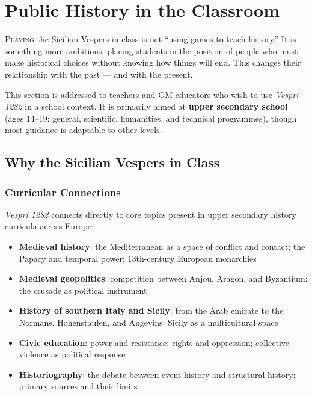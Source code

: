 
\chapter{Public History in the Classroom}

\lettrine[lines=3]{P}{laying} the Sicilian Vespers in class is not
``using games to teach history.'' It is something more ambitious:
placing students in the position of people who must make historical
choices without knowing how things will end. This changes their
relationship with the past --- and with the present.

This section is addressed to teachers and GM-educators who wish to
use \textit{Vespri 1282} in a school context. It is primarily aimed
at \textbf{upper secondary school} (ages 14--19: general, scientific,
humanities, and technical programmes), though most guidance is adaptable
to other levels.


\secsep

\section{Why the Sicilian Vespers in Class}

\subsection{Curricular Connections}

\textit{Vespri 1282} connects directly to core topics present in upper
secondary history curricula across Europe:

\begin{itemize}
  \item \textbf{Medieval history}: the Mediterranean as a space of conflict
    and contact; the Papacy and temporal power; 13th-century European
    monarchies
  \item \textbf{Medieval geopolitics}: competition between Anjou, Aragon,
    and Byzantium; the crusade as political instrument
  \item \textbf{History of southern Italy and Sicily}: from the Arab emirate
    to the Normans, Hohenstaufen, and Angevins; Sicily as a multicultural space
  \item \textbf{Civic education}: power and resistance; rights and oppression;
    collective violence as political response
  \item \textbf{Historiography}: the debate between event-history and structural
    history; primary sources and their limits
\end{itemize}

